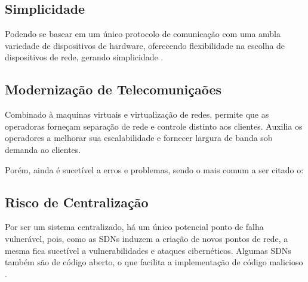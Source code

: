 \subsection{Simplicidade}
Podendo se basear em um único protocolo de comunicação com uma ambla variedade de dispositivos de hardware, oferecendo flexibilidade na escolha de
dispositivos de rede, gerando simplicidade \cite{ibm_sdn}.

\subsection{Modernização de Telecomuniçaões}
Combinado à maquinas virtuais e virtualização de redes, permite que as operadoras forneçam separação de rede e controle distinto aos clientes.
Auxilia os operadores a melhorar sua escalabilidade e fornecer largura de banda sob demanda ao clientes\cite{ibm_sdn}.

Porém, ainda é sucetível a erros e problemas, sendo o mais comum a ser citado o:

\subsection{Risco de Centralização}
Por ser um sistema centralizado, há um único potencial ponto de falha vulnerável, pois, como as SDNs induzem a criação de novos pontos de rede,
a mesma fica sucetível a vulnerabilidades e ataques cibernéticos. Algumas SDNs também são de código aberto, o que facilita a implementação de
código malicioso \cite{ibm_sdn, ufrj_sdn_2018}.